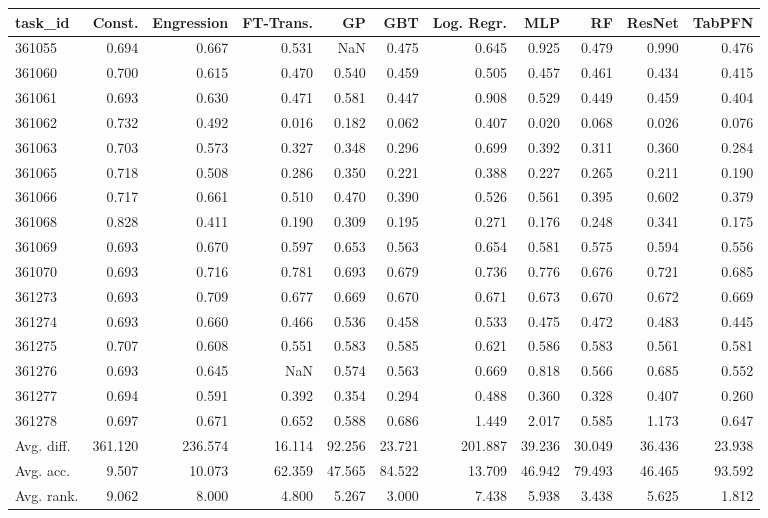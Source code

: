 \begin{tabular}{lrrrrrrrrrr}
\toprule
task\_id & Const. & Engression & FT-Trans. & GP & GBT & Log. Regr. & MLP & RF & ResNet & TabPFN \\
\midrule
361055 & 0.694 & 0.667 & 0.531 & NaN & 0.475 & 0.645 & 0.925 & 0.479 & 0.990 & 0.476 \\
361060 & 0.700 & 0.615 & 0.470 & 0.540 & 0.459 & 0.505 & 0.457 & 0.461 & 0.434 & 0.415 \\
361061 & 0.693 & 0.630 & 0.471 & 0.581 & 0.447 & 0.908 & 0.529 & 0.449 & 0.459 & 0.404 \\
361062 & 0.732 & 0.492 & 0.016 & 0.182 & 0.062 & 0.407 & 0.020 & 0.068 & 0.026 & 0.076 \\
361063 & 0.703 & 0.573 & 0.327 & 0.348 & 0.296 & 0.699 & 0.392 & 0.311 & 0.360 & 0.284 \\
361065 & 0.718 & 0.508 & 0.286 & 0.350 & 0.221 & 0.388 & 0.227 & 0.265 & 0.211 & 0.190 \\
361066 & 0.717 & 0.661 & 0.510 & 0.470 & 0.390 & 0.526 & 0.561 & 0.395 & 0.602 & 0.379 \\
361068 & 0.828 & 0.411 & 0.190 & 0.309 & 0.195 & 0.271 & 0.176 & 0.248 & 0.341 & 0.175 \\
361069 & 0.693 & 0.670 & 0.597 & 0.653 & 0.563 & 0.654 & 0.581 & 0.575 & 0.594 & 0.556 \\
361070 & 0.693 & 0.716 & 0.781 & 0.693 & 0.679 & 0.736 & 0.776 & 0.676 & 0.721 & 0.685 \\
361273 & 0.693 & 0.709 & 0.677 & 0.669 & 0.670 & 0.671 & 0.673 & 0.670 & 0.672 & 0.669 \\
361274 & 0.693 & 0.660 & 0.466 & 0.536 & 0.458 & 0.533 & 0.475 & 0.472 & 0.483 & 0.445 \\
361275 & 0.707 & 0.608 & 0.551 & 0.583 & 0.585 & 0.621 & 0.586 & 0.583 & 0.561 & 0.581 \\
361276 & 0.693 & 0.645 & NaN & 0.574 & 0.563 & 0.669 & 0.818 & 0.566 & 0.685 & 0.552 \\
361277 & 0.694 & 0.591 & 0.392 & 0.354 & 0.294 & 0.488 & 0.360 & 0.328 & 0.407 & 0.260 \\
361278 & 0.697 & 0.671 & 0.652 & 0.588 & 0.686 & 1.449 & 2.017 & 0.585 & 1.173 & 0.647 \\
Avg. diff. & 361.120 & 236.574 & 16.114 & 92.256 & 23.721 & 201.887 & 39.236 & 30.049 & 36.436 & 23.938 \\
Avg. acc. & 9.507 & 10.073 & 62.359 & 47.565 & 84.522 & 13.709 & 46.942 & 79.493 & 46.465 & 93.592 \\
Avg. rank. & 9.062 & 8.000 & 4.800 & 5.267 & 3.000 & 7.438 & 5.938 & 3.438 & 5.625 & 1.812 \\
\bottomrule
\end{tabular}
